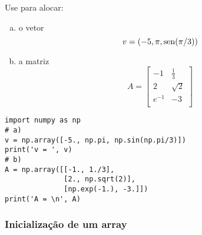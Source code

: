 \begin{exer}
Use {\PYTHONnumpyDOTarray} para alocar:
\begin{enumerate}[a)]
  \item o vetor
  \begin{equation}
    v = \left(-5, \pi, \operatorname{sen}(\pi/3)\right)
  \end{equation}
  \item a matriz
  \begin{equation}
    A = \begin{bmatrix}
    -1 & \displaystyle\frac{1}{3}\\[1em]
    2 & \displaystyle\sqrt{2}\\[1em]
    \displaystyle e^{-1} & -3\\
    \end{bmatrix}
  \end{equation}
\end{enumerate}
\end{exer}
\begin{resp}
  
\begin{lstlisting}
import numpy as np
# a)
v = np.array([-5., np.pi, np.sin(np.pi/3)])
print('v = ', v)
# b)
A = np.array([[-1., 1./3],
              [2., np.sqrt(2)],
              [np.exp(-1.), -3.]])
print('A = \n', A)  
\end{lstlisting}

\end{resp}

\subsubsection{Inicialização de um array}\label{subsubsection:iniarray}

